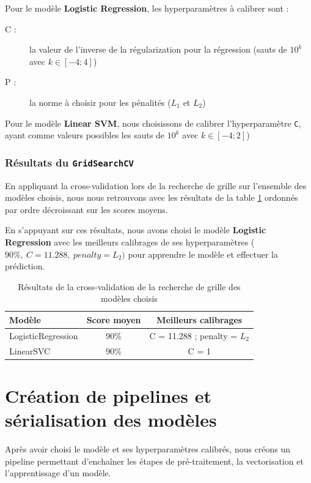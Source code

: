 \documentclass[12pt,a4paper]{report}
\theoremstyle{definition}
\begin{document}
Pour le modèle \textbf{Logistic Regression}, les hyperparamètres à calibrer sont :
\begin{description}
  \item [C :] la valeur de l’inverse de la régularization pour la régression (sauts de $10^k$ avec $k \in [-4; 4]$)
  \item [P :] la norme à choisir pour les pénalités ($L_1$ et $L_2$)
\end{description}

Pour le modèle \textbf{Linear SVM}, nous choisissons de calibrer l'hyperparamètre \texttt{C}, ayant comme valeurs possibles les sauts de $10^k$ avec $k \in [-4; 2]$)

\subsubsection{Résultats du \texttt{GridSearchCV}}
En appliquant la cross-validation lors de la recherche de grille sur l’ensemble des modèles choisis, nous nous retrouvons avec les résultats de la table \ref{table:gridsearch_cv} ordonnés par ordre décroissant sur les scores moyens.

En s'appuyant sur ces résultats, nous avons choisi le modèle \textbf{Logistic Regression} avec les meilleurs calibrages de ses hyperparamètres ($90\%,~ C = 11.288,~ penalty = L_2)$ pour apprendre le modèle et effectuer la prédiction.

\begin{table}
  \centering
  \begin{tabular}{|p{5cm}|c|c|}
    \hline
    \textbf{Modèle} & \textbf{Score moyen} & \textbf{Meilleurs calibrages}\\
    \hline
    \hline
    LogisticRegression & 90\% & C = 11.288 ; penalty = $L_2$\\
    \hline
    LinearSVC & 90\% & C = 1\\
    \hline
  \end{tabular}
  \caption{Résultats de la cross-validation de la recherche de grille des modèles choisis}
  \label{table:gridsearch_cv}
\end{table}

\section{Création de pipelines et sérialisation des modèles}
Après avoir choisi le modèle et ses hyperparamètres calibrés, nous créons un pipeline permettant d'enchaîner les étapes de pré-traitement, la vectorisation et l'apprentissage d'un modèle.
\end{document}

